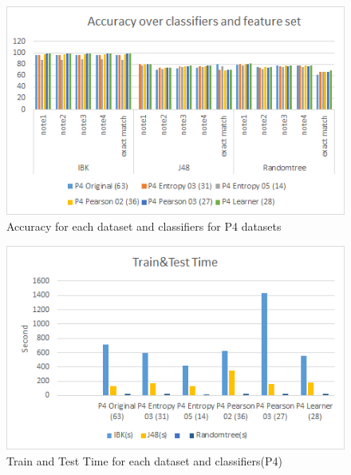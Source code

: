 \documentclass{article}
\begin{document}
\begin{figure}[h]
\includegraphics[scale=.50]{accuracy_p4}
 \caption{Accuracy for each dataset and classifiers for P4 datasets}
\label{figure8}
\end{figure}
\begin{figure}[h]
\includegraphics[scale=.50]{time_p4}
 \caption{Train and Test Time for each dataset and classifiers(P4)}
\label{figure9}
\end{figure}
\end{document}
